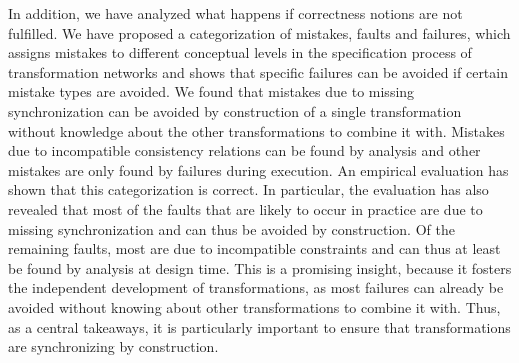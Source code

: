 In addition, we have analyzed what happens if correctness notions are not fulfilled.
We have proposed a categorization of mistakes, faults and failures, which assigns mistakes to different conceptual levels in the specification process of transformation networks and shows that specific failures can be avoided if certain mistake types are avoided.
We found that mistakes due to missing synchronization can be avoided by construction of a single transformation without knowledge about the other transformations to combine it with.
Mistakes due to incompatible consistency relations can be found by analysis and other mistakes are only found by failures during execution.
An empirical evaluation has shown that this categorization is correct.
In particular, the evaluation has also revealed that most of the faults that are likely to occur in practice are due to missing synchronization and can thus be avoided by construction.
Of the remaining faults, most are due to incompatible constraints and can thus at least be found by analysis at design time.
This is a promising insight, because it fosters the independent development of transformations, as most failures can already be avoided without knowing about other transformations to combine it with.
Thus, as a central takeaways, it is particularly important to ensure that transformations are synchronizing by construction.

